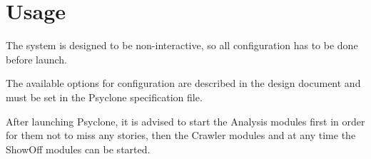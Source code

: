 \chapter{\label{cpt:usage:usage}Usage}

The system is designed to be non-interactive, so all configuration has to be
done before launch.

The available options for configuration are described in the design document
and must be set in the Psyclone specification file.

After launching Psyclone, it is advised to start the Analysis modules first in
order for them not to miss any stories, then the Crawler modules and at any
time the ShowOff modules can be started.

